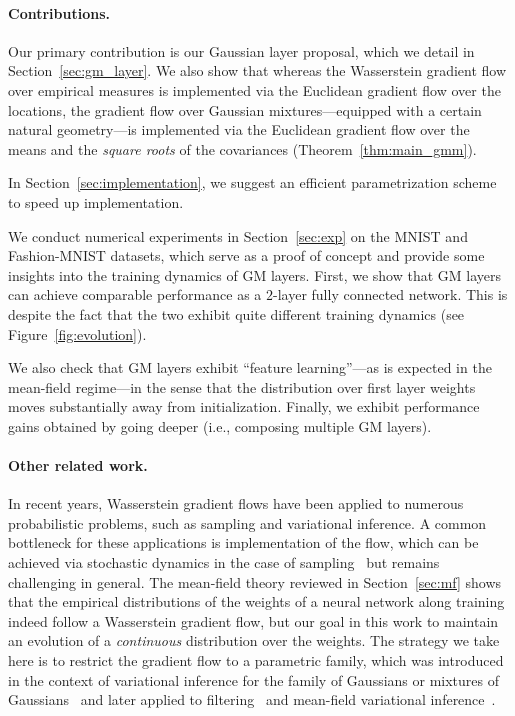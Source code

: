 \documentclass{custom}
\begin{document}
\paragraph{Contributions.}
Our primary contribution is our Gaussian layer proposal, which we detail in Section~\ref{sec:gm_layer}.
We also show that whereas the Wasserstein gradient flow over empirical measures is implemented via the Euclidean gradient flow over the locations, the gradient flow over Gaussian mixtures---equipped with a certain natural geometry---is implemented via the Euclidean gradient flow over the means and the \emph{square roots} of the covariances (Theorem~\ref{thm:main_gmm}).

In Section~\ref{sec:implementation}, we suggest an efficient parametrization scheme to speed up implementation.

We conduct numerical experiments in Section~\ref{sec:exp} on the MNIST and Fashion-MNIST datasets, which serve as a proof of concept and provide some insights into the training dynamics of GM layers.
First, we show that GM layers can achieve comparable performance as a $2$-layer fully connected network.
This is despite the fact that the two exhibit quite different training dynamics (see Figure~\ref{fig:evolution}).

We also check that GM layers exhibit ``feature learning''---as is expected in the mean-field regime---in the sense that the distribution over first layer weights moves substantially away from initialization.
Finally, we exhibit performance gains obtained by going deeper (i.e., composing multiple GM layers).

\paragraph{Other related work.}
In recent years, Wasserstein gradient flows have been applied to numerous probabilistic problems, such as sampling and variational inference.
A common bottleneck for these applications is implementation of the flow, which can be achieved via stochastic dynamics in the case of sampling~\citep{JKO} but remains challenging in general.
The mean-field theory reviewed in Section~\ref{sec:mf} shows that the empirical distributions of the weights of a neural network along training indeed follow a Wasserstein gradient flow, but our goal in this work to maintain an evolution of a \emph{continuous} distribution over the weights.
The strategy we take here is to restrict the gradient flow to a parametric family, which was introduced in the context of variational inference for the family of Gaussians or mixtures of Gaussians~\citep{Lam+22GVI, Diao+23FBGVI} and later applied to filtering~\citep{LamBonBac23VarKushner} and mean-field variational inference~\citep{Gho+22MFVI, JiaChePoo23MFVI, Lac23IndepProj, YaoYan23MFVI}.
\end{document}
